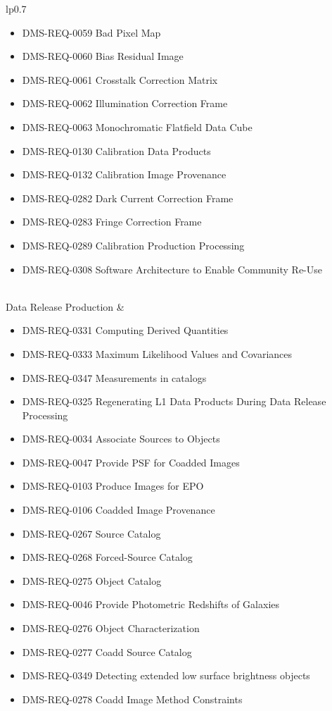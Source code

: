 \begin{xtabular}{lp{0.7\textwidth}}
\begin{itemize}
\item DMS-REQ-0059 Bad Pixel Map
\item DMS-REQ-0060 Bias Residual Image
\item DMS-REQ-0061 Crosstalk Correction Matrix
\item DMS-REQ-0062 Illumination Correction Frame
\item DMS-REQ-0063 Monochromatic Flatfield Data Cube
\item DMS-REQ-0130 Calibration Data Products
\item DMS-REQ-0132 Calibration Image Provenance
\item DMS-REQ-0282 Dark Current Correction Frame
\item DMS-REQ-0283 Fringe Correction Frame
\item DMS-REQ-0289 Calibration Production Processing
\item DMS-REQ-0308 Software Architecture to Enable Community Re-Use
\end{itemize} \\ \hline
Data Release Production &
\begin{itemize}DMS-REQ-0326 Storing Approximations of Per-pixel Metadata
\item DMS-REQ-0331 Computing Derived Quantities
\item DMS-REQ-0333 Maximum Likelihood Values and Covariances
\item DMS-REQ-0347 Measurements in catalogs
\item DMS-REQ-0325 Regenerating L1 Data Products During Data Release Processing
\item DMS-REQ-0034 Associate Sources to Objects
\item DMS-REQ-0047 Provide PSF for Coadded Images
\item DMS-REQ-0103 Produce Images for EPO
\item DMS-REQ-0106 Coadded Image Provenance
\item DMS-REQ-0267 Source Catalog
\item DMS-REQ-0268 Forced-Source Catalog
\item DMS-REQ-0275 Object Catalog
\item DMS-REQ-0046 Provide Photometric Redshifts of Galaxies
\item DMS-REQ-0276 Object Characterization
\item DMS-REQ-0277 Coadd Source Catalog
\item DMS-REQ-0349 Detecting extended  low surface brightness objects
\item DMS-REQ-0278 Coadd Image Method Constraints

\end{itemize}
\end{xtabular}
